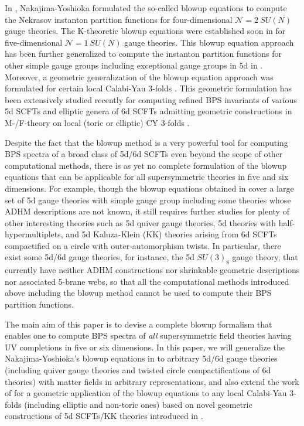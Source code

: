In \cite{Nakajima:2003pg}, Nakajima-Yoshioka formulated the so-called blowup equations to compute the Nekrasov instanton partition functions for four-dimensional $\mathcal{N} = 2\ SU(N)$ gauge theories. The K-theoretic blowup equations were established soon in \cite{Nakajima:2005fg, Gottsche:2006bm} for five-dimensional $\mathcal{N} = 1\ SU(N)$ gauge theories. This blowup equation approach has been further generalized to compute the instanton partition functions for other simple gauge groups including exceptional gauge groups in 5d in \cite{Keller:2012da,Kim:2019uqw}. Moreover, a geometric generalization of the blowup equation approach was formulated for certain local Calabi-Yau 3-folds \cite{Gu:2017ccq, Huang:2017mis}. This geometric formulation has been extensively studied recently for computing refined BPS invariants of various 5d SCFTs and elliptic genera of 6d SCFTs admitting geometric constructions in M-/F-theory on local (toric or elliptic) CY 3-folds \cite{Gu:2017ccq, Huang:2017mis, Gu:2018gmy, Gu:2019dan, Gu:2019pqj, Gu:2020fem}.

Despite the fact that the blowup method is a very powerful tool for computing BPS spectra of a broad class of 5d/6d SCFTs even beyond the scope of other computational methods, there is as yet no complete formulation of the blowup equations that can be applicable for all supersymmetric theories in five and six dimensions. For example, though the blowup equations obtained in \cite{Kim:2019uqw} cover a large set of 5d gauge theories with simple gauge group including some theories whose ADHM descriptions are not known, it still requires further studies for plenty of other interesting theories such as 5d quiver gauge theories, 5d theories with half-hypermultiplets, and 5d Kaluza-Klein (KK) theories arising from 6d SCFTs compactified on a circle with outer-automorphism twists. In particular, there exist some 5d/6d gauge theories, for instance, the 5d $SU(3)_8$ gauge theory, that currently have neither ADHM constructions nor shrinkable geometric descriptions nor associated 5-brane webs, so that all the computational methods introduced above including the blowup method cannot be used to compute their BPS partition functions.

The main aim of this paper is to devise a complete blowup formalism that enables one to compute BPS spectra of {\it all} supersymmetric field theories having UV completions in five or six dimensions. In this paper, we will generalize the Nakajima-Yoshioka's blowup equations in \cite{Nakajima:2003pg} to arbitrary 5d/6d gauge theories (including quiver gauge theories and twisted circle compactifications of 6d theories) with matter fields in arbitrary representations, and also extend the work of \cite{Gu:2017ccq,Huang:2017mis} for a geometric application of the blowup equations to any local Calabi-Yau 3-folds (including elliptic and non-toric ones) based on novel geometric constructions of 5d SCFTs/KK theories introduced in \cite{Jefferson:2018irk,Bhardwaj:2019fzv}.

